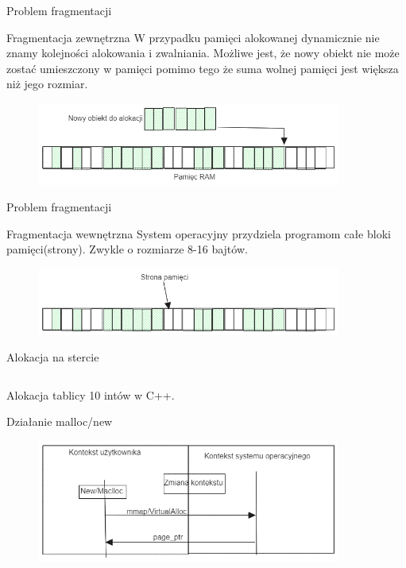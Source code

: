 \documentclass{beamer}
\begin{document}
   \begin{frame}{Problem fragmentacji}
       \begin{block}{Fragmentacja zewnętrzna}
           W przypadku pamięci alokowanej dynamicznie nie znamy kolejności alokowania i zwalniania.
          Możliwe jest, że nowy obiekt nie może zostać umieszczony w pamięci pomimo tego że suma wolnej pamięci 
           jest większa niż jego rozmiar. 
       \end{block}
    
        \begin{figure}
        \centering
        \includegraphics[width=10cm]{fragmentation.png}
        \end{figure}
   \end{frame} 
   
   \begin{frame}{Problem fragmentacji}
       \begin{block}{Fragmentacja wewnętrzna}
           System operacyjny przydziela programom całe bloki pamięci(strony). 
           Zwykle o rozmiarze 8-16 bajtów. 
       \end{block}
    
        \begin{figure}
        \centering
        \includegraphics[width=10cm]{memory_page.png}
        \end{figure}
   \end{frame}

\begin{frame}{Alokacja na stercie}
    
    \inputminted{cpp}{heap_alloc.cpp}
    Alokacja tablicy 10 intów w C++.
\end{frame} 

\begin{frame}{Działanie malloc/new}

        \begin{figure}
        \centering
        \includegraphics[width=10cm]{new_context_switch.png}
        \end{figure}

\end{frame}
\end{document}

